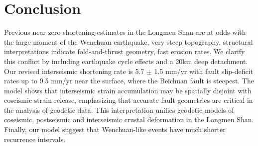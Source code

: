 \documentclass[12pt]{article}
\begin{document}
\section{Conclusion}
Previous near-zero shortening estimates in the Longmen Shan are at odds with the large-moment of the Wenchuan earthquake, very steep topography, structural interpretations indicate fold-and-thrust geometry, fast erosion rates. We clarify this conflict by including earthquake cycle effects and a 20km deep detachment. Our revised interseismic shortening rate is 5.7 $\pm$ 1.5 mm/yr with fault slip-deficit rates up to 9.5 mm/yr near the surface, where the Beichuan fault is steepest. The model shows that interseismic strain accumulation may be spatially disjoint with coseismic strain release, emphasizing that accurate fault geometries are critical in the analysis of geodetic data. This interpretation unifies geodetic models of coseismic, postseismic and interseismic crustal deformation in the Longmen Shan. Finally, our model suggest that Wenchuan-like events have much shorter recurrence intervals.



\end{document}
